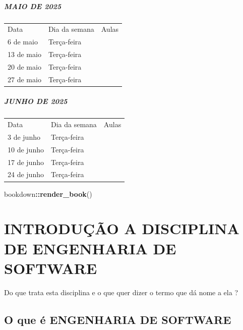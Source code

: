 \documentclass[
]{book}
\newenvironment{Shaded}{\begin{snugshade}}{\end{snugshade}}
\newcommand{\FunctionTok}[1]{\textcolor[rgb]{0.13,0.29,0.53}{\textbf{#1}}}
\newcommand{\NormalTok}[1]{#1}
\newcommand{\SpecialCharTok}[1]{\textcolor[rgb]{0.81,0.36,0.00}{\textbf{#1}}}
\begin{document}
\paragraph{MAIO DE 2025}\label{maio-de-2025}

\begin{longtable}[]{@{}lll@{}}
\toprule\noalign{}
\endhead
\bottomrule\noalign{}
\endlastfoot
Data & Dia da semana & Aulas \\
6 de maio & Terça-feira & \\
13 de maio & Terça-feira & \\
20 de maio & Terça-feira & \\
27 de maio & Terça-feira & \\
\end{longtable}

\paragraph{JUNHO DE 2025}\label{junho-de-2025}

\begin{longtable}[]{@{}lll@{}}
\toprule\noalign{}
\endhead
\bottomrule\noalign{}
\endlastfoot
Data & Dia da semana & Aulas \\
3 de junho & Terça-feira & \\
10 de junho & Terça-feira & \\
17 de junho & Terça-feira & \\
24 de junho & Terça-feira & \\
\end{longtable}

\begin{Shaded}
\begin{Highlighting}[]
\NormalTok{bookdown}\SpecialCharTok{::}\FunctionTok{render\_book}\NormalTok{()}
\end{Highlighting}
\end{Shaded}

\chapter*{INTRODUÇÃO A DISCIPLINA DE ENGENHARIA DE SOFTWARE}\label{introduuxe7uxe3o-a-disciplina-de-engenharia-de-software}

Do que trata esta disciplina e o que quer dizer o termo que dá nome a ela ?

\section{O que é ENGENHARIA DE SOFTWARE}\label{o-que-uxe9-engenharia-de-software}
\end{document}
